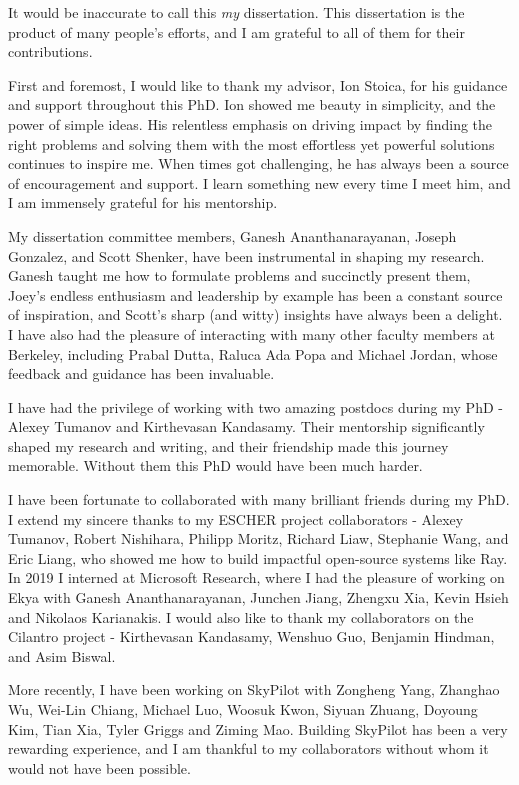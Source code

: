 \begin{acknowledgements}

It would be inaccurate to call this \textit{my} dissertation. This dissertation is the product of many people's efforts, and I am grateful to all of them for their contributions.

First and foremost, I would like to thank my advisor, Ion Stoica, for his guidance and support throughout this PhD. Ion showed me beauty in simplicity, and the power of simple ideas. His relentless emphasis on driving impact by finding the right problems and solving them with the most effortless yet powerful solutions continues to inspire me. When times got challenging, he has always been a source of encouragement and support. I learn something new every time I meet him, and I am immensely grateful for his mentorship.

My dissertation committee members, Ganesh Ananthanarayanan, Joseph Gonzalez, and Scott Shenker, have been instrumental in shaping my research. Ganesh taught me how to formulate problems and succinctly present them, Joey's endless enthusiasm and leadership by example has been a constant source of inspiration, and Scott's sharp (and witty) insights have always been a delight. I have also had the pleasure of interacting with many other faculty members at Berkeley, including Prabal Dutta, Raluca Ada Popa and Michael Jordan, whose feedback and guidance has been invaluable.

I have had the privilege of working with two amazing postdocs during my PhD - Alexey Tumanov and Kirthevasan Kandasamy. Their mentorship significantly shaped my research and writing, and their friendship made this journey memorable. Without them this PhD would have been much harder.

I have been fortunate to collaborated with many brilliant friends during my PhD. I extend my sincere thanks to my ESCHER project collaborators - Alexey Tumanov, Robert Nishihara, Philipp Moritz, Richard Liaw, Stephanie Wang, and Eric Liang, who showed me how to build impactful open-source systems like Ray. In 2019 I interned at Microsoft Research, where I had the pleasure of working on Ekya with Ganesh Ananthanarayanan, Junchen Jiang, Zhengxu Xia, Kevin Hsieh and Nikolaos Karianakis. I would also like to thank my collaborators on the Cilantro project - Kirthevasan Kandasamy, Wenshuo Guo, Benjamin Hindman, and Asim Biswal. 

More recently, I have been working on SkyPilot with Zongheng Yang, Zhanghao Wu, Wei-Lin Chiang, Michael Luo, Woosuk Kwon, Siyuan Zhuang, Doyoung Kim, Tian Xia, Tyler Griggs and Ziming Mao. Building SkyPilot has been a very rewarding experience, and I am thankful to my collaborators without whom it would not have been possible.


\end{acknowledgements}
